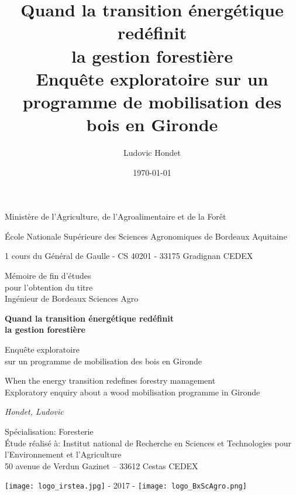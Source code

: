 \documentclass[12pt]{report}
\title{Quand la transition énergétique redéfinit\\
la gestion forestière\\
{\normalsize Enquête exploratoire
sur un programme de mobilisation des bois en Gironde}}
\author{Ludovic Hondet}
\date{\today}
\begin{document}
\begin{titlepage}    
    \centering
    {\normalsize Ministère de l'Agriculture, de l'Agroalimentaire et de la Forêt \par}
    \vspace{20.736pt}
    {{\LARGE École Nationale Supérieure des Sciences
    Agronomiques de Bordeaux Aquitaine}\\
    {\normalsize 1 cours du Général de Gaulle - CS 40201 - 33175 Gradignan CEDEX \par}}
    \vspace{20.736pt}
    {{\LARGE Mémoire de fin d'études}\\
    {\normalsize pour l'obtention du titre}\\
    {\LARGE Ingénieur de Bordeaux Sciences Agro} \par}
    \vspace{72.576pt}
    {{\LARGE \textbf{Quand la transition énergétique redéfinit\\
    la gestion forestière}} \par}
    \vspace{7.2pt}
    {{\Large Enquête exploratoire\\
    sur un programme de mobilisation des bois en Gironde} \par}
    \vspace{20.736pt}
    {{\normalsize When the energy transition redefines forestry management}\\
    {\normalsize Exploratory enquiry about a wood mobilisation programme in Gironde} \par}

    \vfill

    {\large \textit{Hondet, Ludovic} \par}
    \begin{flushleft}
      {\large Spécialisation: Foresterie\\
      Étude réalisé à: Institut national de Recherche en Sciences et Technologies pour l'Environnement et l'Agriculture\\
      50 avenue de Verdun Gazinet -- 33612 Cestas CEDEX \par}
    \end{flushleft}
    
    \vspace{1mm}
    
    {\texttt{[image: logo\_irstea.jpg]} \hfill \LARGE{- 2017 -} \hfill \texttt{[image: logo\_BxScAgro.png]}}
\end{titlepage}
\end{document}
